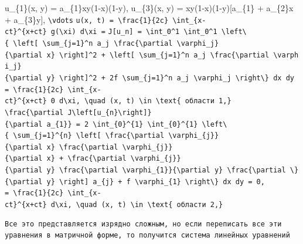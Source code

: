 \documentclass[
  ukrainian,
]{article}
\begin{document}
u\_\{1\}(x, y) = a\_\{1\}xy(1-x)(1-y), u\_\{3\}(x, y) =
xy(1-x)(1-y){[}a\_\{1\} + a\_\{2\}x + a\_\{3\}y{]},
\texttt{\textbackslash{}vdots}
\texttt{u(x,\ t)\ =\ \textbackslash{}frac\{1\}\{2c\}\ \textbackslash{}int\_\{x-ct\}\^{}\{x+ct\}\ g(\textbackslash{}xi)\ d\textbackslash{}xi\ =}
\texttt{J{[}u\_n{]}\ =\ \textbackslash{}int\_0\^{}1\ \textbackslash{}int\_0\^{}1\ \textbackslash{}left\textbackslash{}\{\ \textbackslash{}left{[}\ \textbackslash{}sum\_\{j=1\}\^{}n\ a\_j\ \textbackslash{}frac\{\textbackslash{}partial\ \textbackslash{}varphi\_j\}\{\textbackslash{}partial\ x\}\ \textbackslash{}right{]}\^{}2\ +\ \textbackslash{}left{[}\ \textbackslash{}sum\_\{j=1\}\^{}n\ a\_j\ \textbackslash{}frac\{\textbackslash{}partial\ \textbackslash{}varphi\_j\}\{\textbackslash{}partial\ y\}\ \textbackslash{}right{]}\^{}2\ +\ 2f\ \textbackslash{}sum\_\{j=1\}\^{}n\ a\_j\ \textbackslash{}varphi\_j\ \textbackslash{}right\textbackslash{}\}\ dx\ dy}
\texttt{=\ \textbackslash{}frac\{1\}\{2c\}\ \textbackslash{}int\_\{x-ct\}\^{}\{x+ct\}\ 0\ d\textbackslash{}xi,\ \textbackslash{}quad\ (x,\ t)\ \textbackslash{}in\ \textbackslash{}text\{\ области\ 1,\}}
\texttt{\textbackslash{}frac\{\textbackslash{}partial\ J\textbackslash{}left{[}u\_\{n\}\textbackslash{}right{]}\}\{\textbackslash{}partial\ a\_\{1\}\}\ =\ 2\ \textbackslash{}int\_\{0\}\^{}\{1\}\ \textbackslash{}int\_\{0\}\^{}\{1\}\ \textbackslash{}left\textbackslash{}\{\ \textbackslash{}sum\_\{j=1\}\^{}\{n\}\ \textbackslash{}left{[}\ \textbackslash{}frac\{\textbackslash{}partial\ \textbackslash{}varphi\_\{j\}\}\{\textbackslash{}partial\ x\}\ \textbackslash{}frac\{\textbackslash{}partial\ \textbackslash{}varphi\_\{j\}\}\{\textbackslash{}partial\ x\}\ +\ \textbackslash{}frac\{\textbackslash{}partial\ \textbackslash{}varphi\_\{j\}\}\{\textbackslash{}partial\ y\}\ \textbackslash{}frac\{\textbackslash{}partial\ \textbackslash{}varphi\_\{1\}\}\{\textbackslash{}partial\ y\}\ \textbackslash{}frac\{\textbackslash{}partial\ \textbackslash{}\}\{\textbackslash{}partial\ y\}\ \textbackslash{}right{]}\ a\_\{j\}\ +\ f\ \textbackslash{}varphi\_\{1\}\ \textbackslash{}right\textbackslash{}\}\ dx\ dy\ =\ 0,}
\texttt{=\ \textbackslash{}frac\{1\}\{2c\}\ \textbackslash{}int\_\{x-ct\}\^{}\{x+ct\}\ d\textbackslash{}xi,\ \textbackslash{}quad\ (x,\ t)\ \textbackslash{}in\ \textbackslash{}text\{\ области\ 2,\}}

\begin{verbatim}
Все это представляется изрядно сложным, но если переписать все эти уравнения в матричной форме, то получится система линейных уравнений
\end{verbatim}
\end{document}
